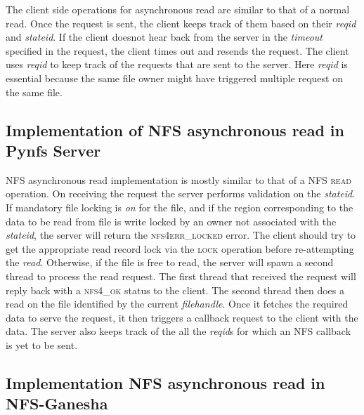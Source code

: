 The client side operations for asynchronous read are similar to that of a normal read. Once the request is sent, the client keeps track of them based on their \textit{reqid} and \textit{stateid}. If the client doesnot hear back from the server in the \textit{timeout} specified in the request, the client times out and resends the request. The client uses \textit{reqid} to keep track of the requests that are sent to the server.  Here \textit{reqid} is essential because the same file owner might have triggered multiple request on the same file.  
  
\subsection{Implementation of NFS asynchronous read in Pynfs Server}
 NFS asynchronous read implementation is mostly similar to that of a \textsc{NFS read} operation. On receiving the request the server performs validation on the \textit{stateid}. If mandatory file locking is \textit{on} for the file, and if the region corresponding to the data to be read from file is write locked by an owner not associated with the \textit{stateid}, the server will return the \textsc{nfs4err\_locked} error. The client should try to get the appropriate read record lock via the \textsc{lock} operation before re-attempting the \textit{read}. Otherwise, if the file is free to read, the server will spawn a second thread to process the read request. The first thread that received the request will reply back with a \textsc{nfs4\_ok} status to the client. The second thread then does a read on the file identified by the current \textit{filehandle}. Once it fetches the required data to serve the request, it then triggers a callback request to the client with the data. The server also keeps track of the all the \textit{reqid}s for which an NFS callback is yet to be sent.
 
    
\subsection{Implementation NFS asynchronous read in NFS-Ganesha}  

